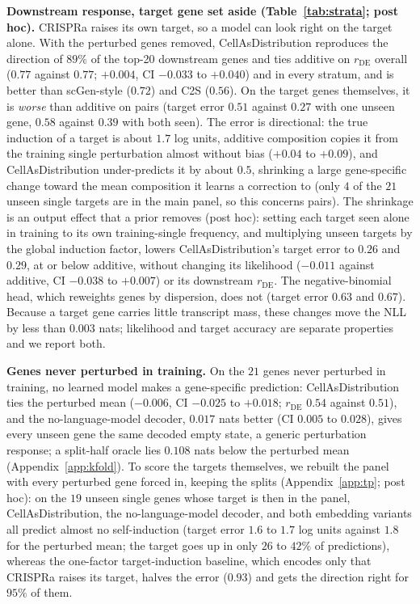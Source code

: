 \documentclass[10pt]{article}
\newcommand{\cad}{CellAsDistribution}
\newcommand{\todo}[1]{{\color{red}[TODO: #1]}}
\newcommand{\autoinput}[1]{\IfFileExists{#1}{}{\todo{missing \detokenize{#1}}}}
\begin{document}
\autoinput{auto_rev3/tab_strata.tex}
\textbf{Downstream response, target gene set aside (Table~\ref{tab:strata}; post hoc).} CRISPRa raises its own target, so a model can look right on the target alone. With the perturbed genes removed, \cad{} reproduces the direction of $89\%$ of the top-20 downstream genes and ties additive on $r_{\mathrm{DE}}$ overall ($0.77$ against $0.77$; $+0.004$, CI $-0.033$ to $+0.040$) and in every stratum, and is better than scGen-style ($0.72$) and C2S ($0.56$). On the target genes themselves, it is \emph{worse} than additive on pairs (target error $0.51$ against $0.27$ with one unseen gene, $0.58$ against $0.39$ with both seen). The error is directional: the true induction of a target is about $1.7$ log units, additive composition copies it from the training single perturbation almost without bias ($+0.04$ to $+0.09$), and \cad{} under-predicts it by about $0.5$, shrinking a large gene-specific change toward the mean composition it learns a correction to (only $4$ of the $21$ unseen single targets are in the main panel, so this concerns pairs). The shrinkage is an output effect that a prior removes (post hoc): setting each target seen alone in training to its own training-single frequency, and multiplying unseen targets by the global induction factor, lowers \cad{}'s target error to $0.26$ and $0.29$, at or below additive, without changing its likelihood ($-0.011$ against additive, CI $-0.038$ to $+0.007$) or its downstream $r_{\mathrm{DE}}$. The negative-binomial head, which reweights genes by dispersion, does not (target error $0.63$ and $0.67$). Because a target gene carries little transcript mass, these changes move the NLL by less than $0.003$ nats; likelihood and target accuracy are separate properties and we report both.

\textbf{Genes never perturbed in training.} On the $21$ genes never perturbed in training, no learned model makes a gene-specific prediction: \cad{} ties the perturbed mean ($-0.006$, CI $-0.025$ to $+0.018$; $r_{\mathrm{DE}}$ $0.54$ against $0.51$), and the no-language-model decoder, $0.017$ nats better (CI $0.005$ to $0.028$), gives every unseen gene the same decoded empty state, a generic perturbation response; a split-half oracle lies $0.108$ nats below the perturbed mean (Appendix~\ref{app:kfold}). To score the targets themselves, we rebuilt the panel with every perturbed gene forced in, keeping the splits (Appendix~\ref{app:tp}; post hoc): on the $19$ unseen single genes whose target is then in the panel, \cad{}, the no-language-model decoder, and both embedding variants all predict almost no self-induction (target error $1.6$ to $1.7$ log units against $1.8$ for the perturbed mean; the target goes up in only $26$ to $42\%$ of predictions), whereas the one-factor target-induction baseline, which encodes only that CRISPRa raises its target, halves the error ($0.93$) and gets the direction right for $95\%$ of them.
\end{document}
